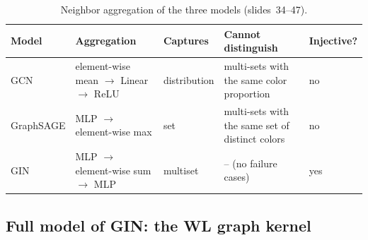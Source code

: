 \begin{table}[htbp]
  \centering\small
  \caption{Neighbor aggregation of the three models (slides~34--47).}
  \label{tab:lec06-agg}
  \renewcommand{\arraystretch}{1.2}
  \begin{tabularx}{\textwidth}{@{}l>{\raggedright\arraybackslash}p{3.6cm}l>{\raggedright\arraybackslash}Xl@{}}
    \toprule
    Model & Aggregation & Captures & Cannot distinguish & Injective?\\
    \midrule
    GCN & element-wise mean $\to$ Linear $\to$ ReLU & distribution
        & multi-sets with the same color proportion & no\\
    GraphSAGE & MLP $\to$ element-wise max & set
        & multi-sets with the same set of distinct colors & no\\
    GIN & MLP $\to$ element-wise sum $\to$ MLP & multiset
        & -- (no failure cases) & yes\\
    \bottomrule
  \end{tabularx}
\end{table}

\subsection{Full model of GIN: the WL graph kernel}\label{sec:lec06-wl}


